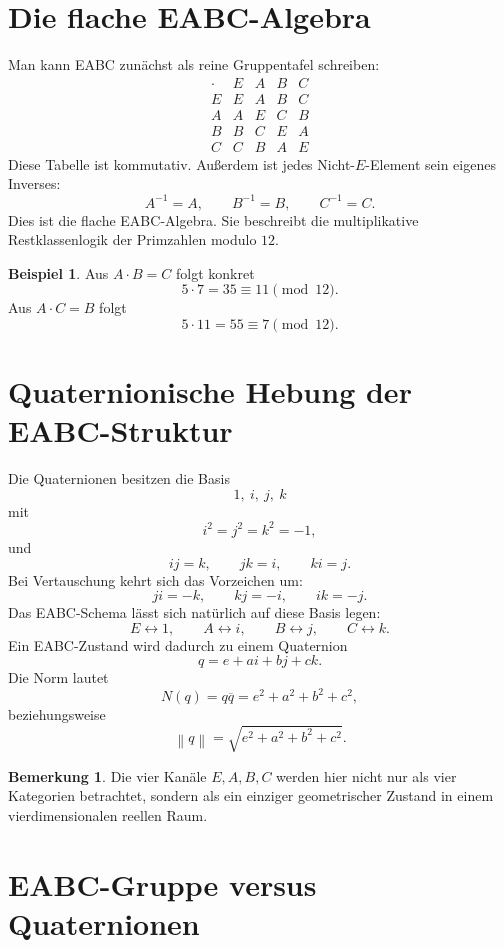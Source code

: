 \documentclass[11pt,a4paper]{article}
\theoremstyle{definition}
\newtheorem{beispiel}[definition]{Beispiel}
\newtheorem{bemerkung}[definition]{Bemerkung}
\theoremstyle{plain}
\newcommand{\norm}[1]{\left\lVert #1 \right\rVert}
\newcommand{\conj}[1]{\overline{#1}}
\begin{document}
	\section{Die flache EABC-Algebra}
	
	Man kann EABC zunächst als reine Gruppentafel schreiben:
	\[
	\begin{array}{c|cccc}
		\cdot & E & A & B & C\\
		\hline
		E & E & A & B & C\\
		A & A & E & C & B\\
		B & B & C & E & A\\
		C & C & B & A & E
	\end{array}
	\]
	Diese Tabelle ist kommutativ. Außerdem ist jedes Nicht-$E$-Element sein eigenes Inverses:
	\[
	A^{-1}=A,\qquad B^{-1}=B,\qquad C^{-1}=C.
	\]
	Dies ist die flache EABC-Algebra. Sie beschreibt die multiplikative Restklassenlogik der Primzahlen modulo $12$.
	
	\begin{beispiel}
		Aus $A\cdot B=C$ folgt konkret
		\[
		5\cdot 7=35\equiv 11\pmod{12}.
		\]
		Aus $A\cdot C=B$ folgt
		\[
		5\cdot 11=55\equiv 7\pmod{12}.
		\]
	\end{beispiel}
	
	\section{Quaternionische Hebung der EABC-Struktur}
	
	Die Quaternionen besitzen die Basis
	\[
	1,\ i,\ j,\ k
	\]
	mit
	\[
	i^2=j^2=k^2=-1,
	\]
	und
	\[
	ij=k,\qquad jk=i,\qquad ki=j.
	\]
	Bei Vertauschung kehrt sich das Vorzeichen um:
	\[
	ji=-k,\qquad kj=-i,\qquad ik=-j.
	\]
	Das EABC-Schema lässt sich natürlich auf diese Basis legen:
	\[
	E\longleftrightarrow 1,
	\qquad
	A\longleftrightarrow i,
	\qquad
	B\longleftrightarrow j,
	\qquad
	C\longleftrightarrow k.
	\]
	Ein EABC-Zustand wird dadurch zu einem Quaternion
	\[
	q=e+ai+bj+ck.
	\]
	Die Norm lautet
	\[
	N(q)=q\conj q=e^2+a^2+b^2+c^2,
	\]
	beziehungsweise
	\[
	\norm q=\sqrt{e^2+a^2+b^2+c^2}.
	\]
	
	\begin{bemerkung}
		Die vier Kanäle $E,A,B,C$ werden hier nicht nur als vier Kategorien betrachtet, sondern als ein einziger geometrischer Zustand in einem vierdimensionalen reellen Raum.
	\end{bemerkung}
	
	\section{EABC-Gruppe versus Quaternionen}
	
\end{document}
